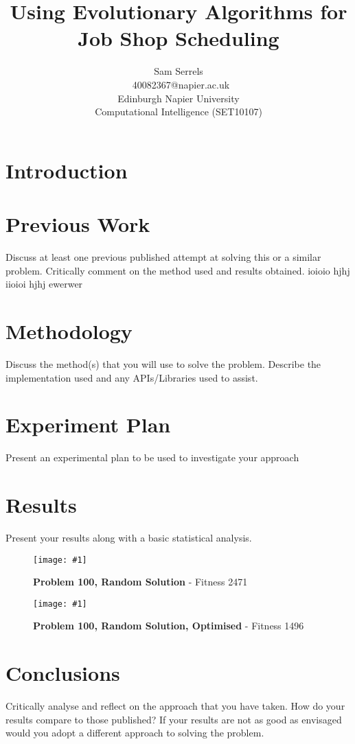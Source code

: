\documentclass[14pt]{acmsiggraph}
\title{Using Evolutionary Algorithms for Job Shop Scheduling}
\author{Sam Serrels\\\ 40082367@napier.ac.uk \\
Edinburgh Napier University\\
Computational Intelligence (SET10107)}
\newcommand{\figuremacroW}[4]{
	\begin{figure}[h] %
		\centering
		\texttt{[image: \#1]}
		\caption[#2]{\textbf{#2} - #3}
		\label{fig:#1}
	\end{figure}
}
\begin{document}
\maketitle
\begin{abstract}
	\lipsum[5]
\end{abstract}

\section{Introduction}
\lipsum[5]

\section{Previous  Work}
Discuss at least one previous published attempt at solving this or a similar problem. 
Critically comment on the method used and results obtained.
\lipsum[7]
\cite{gonzalez2013efficient}
ioioio
hjhj \cite{gao2011efficient}
iioioi
hjhj \cite{zhang2011effective}
\lipsum[7]
\cite{driss2015effective}
ewerwer
\cite{wang2012new}

\section{Methodology}
Discuss the method(s) that you will use to solve the problem. 
Describe the implementation used and any APIs/Libraries used to assist.
\lipsum[7]
\lipsum[7]
\lipsum[7]
\lipsum[7]
\lipsum[7]
\lipsum[7]

\section{Experiment Plan}
Present an experimental plan to be used to investigate your approach
\lipsum[7]
\lipsum[7]
\lipsum[7]
\lipsum[7]
\lipsum[7]
\lipsum[7]

\section{Results}
Present your results along with a basic statistical analysis.

\figuremacroW
{p100rnd}
{Problem 100, Random Solution}
{Fitness 2471}
{1.0}
\figuremacroW
{p100rndopt}
{Problem 100, Random Solution, Optimised}
{Fitness 1496}
{1.0}


\lipsum[7]
\section{Conclusions}
Critically analyse and reflect on the approach that you have taken. How do your results compare to those published? If your results are not as good as envisaged would you adopt a different approach to solving the problem.
\end{document}
